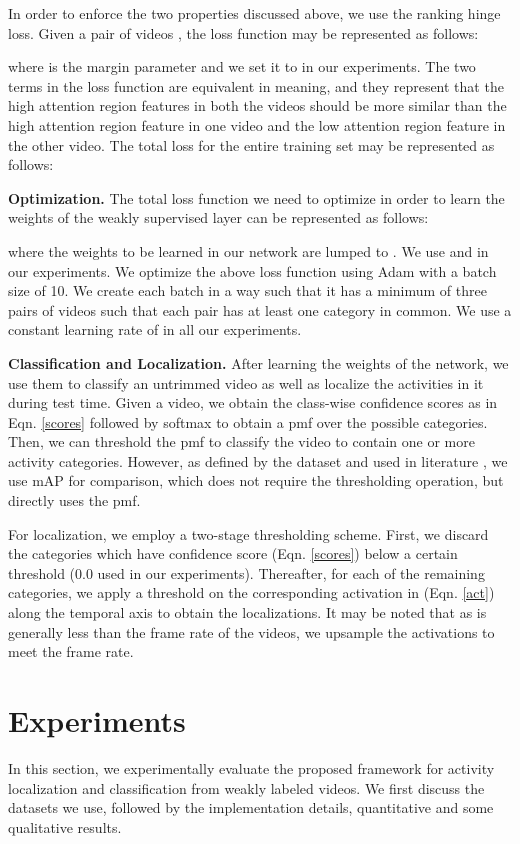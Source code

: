 \documentclass[runningheads]{llncs}
\begin{document}
In order to enforce the two properties discussed above, we use the ranking hinge loss. Given a pair of videos , the loss function may be represented as follows:

where  is the margin parameter and we set it to  in our experiments. The two terms in the loss function are equivalent in meaning, and they represent that the high attention region features in both the videos should be more similar than the high attention region feature in one video and the low attention region feature in the other video. The total loss for the entire training set may be represented as follows:


\textbf{Optimization.} The total loss function we need to optimize in order to learn the weights of the weakly supervised layer can be represented as follows:

where the weights to be learned in our network are lumped to . We use  and  in our experiments. We optimize the above loss function using Adam \cite{kingma2014adam} with a batch size of 10. We create each batch in a way such that it has a minimum of three pairs of videos such that each pair has at least one category in common. We use a constant learning rate of  in all our experiments.

\textbf{Classification and Localization.} After learning the weights of the network, we use them to classify an untrimmed video as well as localize the activities in it during test time. Given a video, we obtain the class-wise confidence scores as in Eqn. \ref{scores} followed by softmax to obtain a pmf over the possible categories. Then, we can threshold the pmf to classify the video to contain one or more activity categories. However, as defined by the dataset \cite{idrees2017thumos} and used in literature \cite{wang2017untrimmednets}, we use mAP for comparison, which does not require the thresholding operation, but directly uses the pmf. 

For localization, we employ a two-stage thresholding scheme. First, we discard the categories which have confidence score (Eqn. \ref{scores}) below a certain threshold (0.0 used in our experiments). Thereafter, for each of the remaining categories, we apply a threshold on the corresponding activation in  (Eqn. \ref{act}) along the temporal axis to obtain the localizations. It may be noted that as  is generally less than the frame rate of the videos, we upsample the activations to meet the frame rate. 

\section{Experiments}
\label{exp}
In this section, we experimentally evaluate the proposed framework for activity localization and classification from weakly labeled videos. We first discuss the datasets we use, followed by the implementation details, quantitative and some qualitative results.
\end{document}
